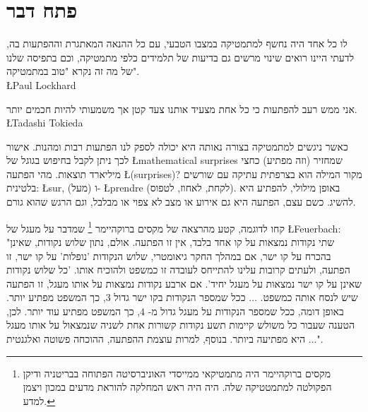 \tableofcontents
\thispagestyle{empty}
\pagestyle{plain}


\chapter*{פתח דבר}


\begin{flushleft}
\parbox{7cm}{
\begin{small}
\begin{flushleft}
לו כל אחד היה נחשף למתמטיקה במצבו הטבעי, עם כל ההנאה המאתגרת וההפתעות בה, לדעתי היינו רואים שינוי מרשים גם בדיעות של תלמידים כלפי מתמטיקה, וכם בתפיסה שלנו של מה זה נקרא "טוב במתמטיקה".\\
\L{Paul Lockhard}

\smallskip

אני ממש רעב להפתעות כי כל אחת מצעיד אותנו צעד קטן אך משמעותי להיות חכמים יותר.\\
\L{Tadashi Tokieda}
\end{flushleft}
\end{small}
}
\end{flushleft}

כאשר ניגשים למתמטיקה בצורה נאותה היא יכולה לספק לנו הפתעות רבות ומהנות. אישור לכך ניתן לקבל בחיפוש בגוגל של 
\L{mathematical surprises}
שמחזיר (וזה מפתיע) כחצי מיליארד תוצאות. מהי הפתעה
\L{(surprises)}?
מקור המילה הוא בצרפתית עתיקה עם שורשים בלטינית: 
\L{sur},
(מעל) ו-%
\L{prendre}
(לקחת, לאחוז, לטפוס). באופן מילולי, להפתיע היא להשיג. כשם עצם, הפתעה היא גם אירוע או מצב לא צפוי או מבלבל, וגם הרגש שהוא גורם.


קחו לדוגמה, קטע מהרצאה של מקסים ברוקהיימר%
\footnote{מקסים ברוקהיימר היה מתמטיקאי ממייסדי האוניברסיטה הפתוחה בבריטניה ודיקן הפקולטה למתמטטיקה שלה. היה היה ראש המחלקה להוראת מדעים במכון ויצמן למדע.}
שמדבר על מעגל של
\L{Feuerbach}:
"שתי נקודות נמצאות על קו אחד בלבד, אין זו הפתעה. אולם, נתון שלוש נקודות, שאינן בהכרח על קו ישר, אם במהלך החקר גיאומטרי, שלוש הנקודות 'נופלות' על קו ישר, זו הפתעה, ולעתים קרובות עלינו להתייחס לעובדה זו כמשפט ולהוכיח אותו. 'כל שלוש נקודות שאינן על קו ישר נמצאות על מעגל יחיד'. אם ארבע נקודות נמצאות על אותו מעגל, זו הפתעה שיש לנסח אותה כמשפט.
$\ldots$
ככל שמספר הנקודות בקו ישר גדול $3$, כך המשפט מפתיע יותר. באופן דומה, ככל שמספר הנקודות על מעגל גדול מ-%
$4$,
כך המשפט מפתיע עוד יותר. לכן, הטענה שעבור כל משולש קיימות תשע נקודות קשורות אחת לשניה שנמצאול על אותו מעגל  
$\ldots$
היא מפתיעה ביותר. בנוסף, למרות עוצמת ההפתעה, ההוכחה פשוטה ואלגנטית".

